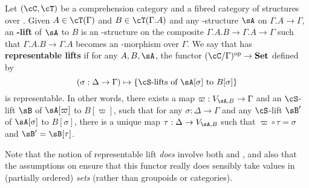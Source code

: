 \documentclass{amsart}
\let\S\cS
\let\C\cC
\let\T\cT
\begin{document}
\begin{defn}\label{defn:replift}
  Let $(\C,\T)$ be a comprehension category and \S a fibred category of structures over \C.
  Given $A\in\T(\Gamma)$ and $B\in\T(\Gamma.A)$ and any \S-structure $\sA$ on $\Gamma.A\to\Gamma$, an \textbf{\S-lift} of $\sA$ to $B$ is an \S-structure on the composite $\Gamma.A.B\to\Gamma.A\to\Gamma$ such that $\Gamma.A.B\to\Gamma.A$ becomes an \S-morphism over $\Gamma$.
  We say that \S has \textbf{representable lifts} if for any $A,B,\sA$, the functor $(\C/\Gamma)\op \to \mathbf{Set}$ defined by
  \begin{equation*}
    (\sigma:\Delta\to\Gamma) \mapsto \{ \text{\S-lifts of $\sA[\sigma]$ to $B[\sigma]$}\}
  \end{equation*}
  is representable.
  In other words, there exists a map $\varpi:V_{\sA,B}\to\Gamma$ and an $\S$-lift $\sB$ of $\sA[\varpi]$ to $B[\varpi]$, such that for any $\sigma:\Delta\to\Gamma$ and any $\S$-lift $\sB'$ of $\sA[\sigma]$ to $B[\sigma]$, there is a unique map $\tau:\Delta\to V_{\sA,B}$ such that $\varpi \circ \tau = \sigma$ and $\sB' = \sB[\tau]$.
\end{defn}

Note that the notion of representable lift \emph{does} involve both \S and \T, and also that the assumptions on \S ensure that this functor really does sensibly take values in (partially ordered) \emph{sets} (rather than groupoids or categories).
\end{document}
